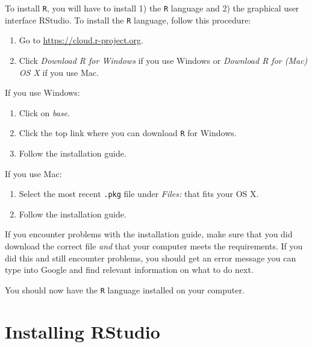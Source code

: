 \documentclass[12pt,oneside]{reedthesis}
\providecommand{\tightlist}{%
  \setlength{\itemsep}{0pt}\setlength{\parskip}{0pt}}
\theoremstyle{definition}
\theoremstyle{definition}
\theoremstyle{definition}
\theoremstyle{remark}
\begin{document}
  To install \texttt{R}, you will have to install 1) the \texttt{R}
  language and 2) the graphical user interface RStudio. To install the
  \texttt{R} language, follow this procedure:
  \begin{enumerate}
  \def\labelenumi{\arabic{enumi}.}
  \tightlist
  \item
    Go to \url{https://cloud.r-project.org}.
  \item
    Click \emph{Download R for Windows} if you use Windows or
    \emph{Download R for (Mac) OS X} if you use Mac.
  \end{enumerate}
  If you use Windows:
  \begin{enumerate}
  \def\labelenumi{\arabic{enumi}.}
  \setcounter{enumi}{2}
  \tightlist
  \item
    Click on \emph{base}.
  \item
    Click the top link where you can download \texttt{R} for Windows.
  \item
    Follow the installation guide.
  \end{enumerate}
  If you use Mac:
  \begin{enumerate}
  \def\labelenumi{\arabic{enumi}.}
  \setcounter{enumi}{2}
  \tightlist
  \item
    Select the most recent \texttt{.pkg} file under \emph{Files:} that
    fits your OS X.
  \item
    Follow the installation guide.
  \end{enumerate}
  If you encounter problems with the installation guide, make sure that
  you did download the correct file \emph{and} that your computer meets
  the requirements. If you did this and still encounter problems, you
  should get an error message you can type into Google and find relevant
  information on what to do next.
  
  You should now have the \texttt{R} language installed on your computer.
  
  \section{Installing RStudio}\label{installing-rstudio}
  
\end{document}
